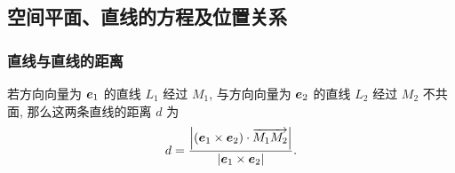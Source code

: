 % 
% 
% 
% 
% 
% 

\subsection{空间平面、直线的方程及位置关系}

\subsubsection{直线与直线的距离}

\begin{theorem}[异面直线距离]
    若方向向量为 $\vb*{e}_1$ 的直线 $L_1$ 经过 $M_1$, 与方向向量为 $\vb*{e}_2$ 的直线 $L_2$ 经过 $M_2$ 不共面, 那么这两条直线的距离 $d$ 为
    $$
        d=\dfrac{\qty|\qty(\vb*{e}_1\times\vb*{e}_2)\cdot \overrightarrow{M_1M_2} |}{|\vb*{e}_1\times\vb*{e}_2|}.
    $$
\end{theorem}

